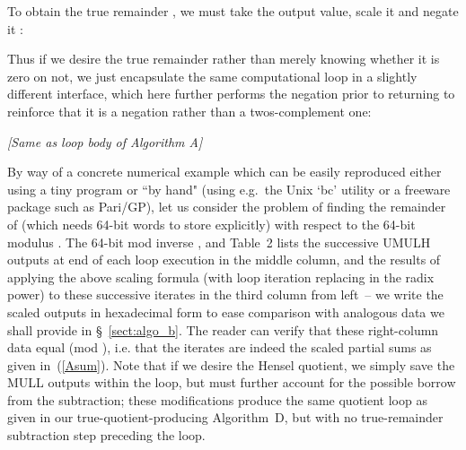 \documentclass{article}
\begin{document}
To obtain the true remainder , we must take the output value, scale it and negate it :

Thus if we desire the true remainder rather than merely knowing whether it is zero on not, we just encapsulate the same computational loop in a slightly different interface, which here further performs the negation prior to returning to reinforce that it is a  negation rather than a twos-complement  one:
\vspace{0.1in}

\begin{algorithm}[H]
\SetAlgoLined
{}
\vspace{0.1in}
{
	{\em [Same as loop body of Algorithm A]}\\
	\eIf {} {
		\Return \;
	}{
		\Return \;
	}
}
\caption{REMAINDER\_A, fast right-to-left scaled remainder computation}
\label{algo_ar}
\end{algorithm}
\vspace{0.1in}

By way of a concrete numerical example which can be easily reproduced either using a tiny program or ``by hand" (using e.g.~the Unix `bc' utility or a freeware package such as Pari/GP), let us consider the problem of finding the remainder of  (which needs  64-bit words to store explicitly) with respect to the 64-bit modulus . The 64-bit mod inverse , and Table~2 lists the successive UMULH outputs at end of each loop execution in the middle column, and the results of applying the above scaling formula (with loop iteration  replacing  in the radix power) to these successive iterates in the third column from left~-- we write the scaled outputs in hexadecimal form to ease comparison with analogous data we shall provide in \S~\ref{sect:algo_b}. The reader can verify that these right-column data equal  (mod ), i.e. that the iterates are indeed the scaled partial sums as given in~(\ref{Asum}). Note that if we desire the Hensel quotient, we simply save the MULL outputs within the loop, but must further account for the possible borrow from the subtraction; these modifications produce the same quotient loop as given in our true-quotient-producing Algorithm~D, but with no true-remainder subtraction step preceding the loop.
\end{document}
